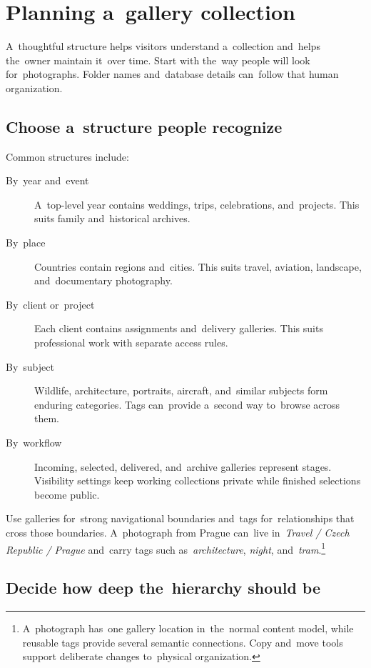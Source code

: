 \documentclass[11pt,a4paper]{article}
\begin{document}
\section{Planning a~gallery collection}
\label{sec:planning}

A~thoughtful structure helps visitors understand a~collection and~helps
the~owner maintain it~over time. Start with the~way people will look
for~photographs. Folder names and~database details can~follow that human
organization.

\subsection{Choose a~structure people recognize}

Common structures include:

\begin{description}
  \item[By~year and~event] A~top-level year contains weddings, trips,
  celebrations, and~projects. This suits family and~historical archives.
  \item[By~place] Countries contain regions and~cities. This suits travel,
  aviation, landscape, and~documentary photography.
  \item[By~client or~project] Each client contains assignments and~delivery
  galleries. This suits professional work with separate access rules.
  \item[By~subject] Wildlife, architecture, portraits, aircraft, and~similar
  subjects form enduring categories. Tags can~provide a~second way to~browse
  across them.
  \item[By~workflow] Incoming, selected, delivered, and~archive galleries
  represent stages. Visibility settings keep working collections private while
  finished selections become public.
\end{description}

Use galleries for~strong navigational boundaries and~tags for~relationships that
cross those boundaries. A~photograph from Prague can~live in~\emph{Travel /
Czech Republic / Prague} and~carry tags such as~\emph{architecture},
\emph{night}, and~\emph{tram}.\footnote{A~photograph has~one gallery location
in~the~normal content model, while reusable tags provide several semantic
connections. Copy and~move tools support deliberate changes to~physical
organization.}

\subsection{Decide how deep the~hierarchy should be}
\end{document}
